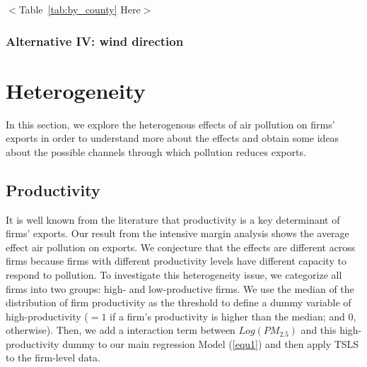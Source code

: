 \documentclass[12pt]{article}
\begin{document}
\begin{center}
$<$Table~\ref{tab:by_county} Here$>$
\end{center}

\subsubsection{Alternative IV: wind direction}

\label{sec:5.1.1}

\section{Heterogeneity}

\label{sec:5} %

In this section, we explore the heterogenous effects of air pollution on
firms' exports in order to understand more about the effects and obtain some
ideas about the possible channels through which pollution reduces exports.

\subsection{Productivity}

\label{sec:5.2.1} It is well known from the literature that productivity is
a key determinant of firms' exports. Our result from the intensive margin
analysis shows the average effect air pollution on exports. We conjecture
that the effects are different across firms because firms with different
productivity levels have different capacity to respond to pollution. To
investigate this heterogeneity issue, we categorize all firms into two
groups: high- and low-productive firms. We use the median of the
distribution of firm productivity as the threshold to define a dummy
variable of high-productivity ($=1$ if a firm's productivity is higher than
the median; and 0, otherwise). Then, we add a interaction term between $%
Log(PM_{2.5})$ and this high-productivity dummy to our main regression Model
(\ref{equ1}) and then apply TSLS to the firm-level data.

\end{document}
